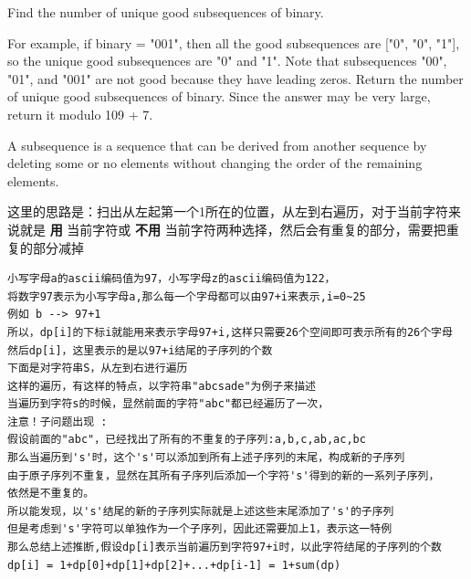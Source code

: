 \documentclass[9pt, b5paaper]{book}
\begin{document}
Find the number of unique good subsequences of binary.

For example, if binary = "001", then all the good subsequences are ["0", "0", "1"], so the unique good subsequences are "0" and "1". Note that subsequences "00", "01", and "001" are not good because they have leading zeros.
Return the number of unique good subsequences of binary. Since the answer may be very large, return it modulo 109 + 7.

A subsequence is a sequence that can be derived from another sequence by deleting some or no elements without changing the order of the remaining elements.

这里的思路是：扫出从左起第一个1所在的位置，从左到右遍历，对于当前字符来说就是 \textbf{用} 当前字符或 \textbf{不用} 当前字符两种选择，然后会有重复的部分，需要把重复的部分减掉
\begin{verbatim}
小写字母a的ascii编码值为97，小写字母z的ascii编码值为122，
将数字97表示为小写字母a,那么每一个字母都可以由97+i来表示,i=0~25
例如 b --> 97+1
所以，dp[i]的下标i就能用来表示字母97+i,这样只需要26个空间即可表示所有的26个字母
然后dp[i]，这里表示的是以97+i结尾的子序列的个数
下面是对字符串S，从左到右进行遍历
这样的遍历，有这样的特点，以字符串"abcsade"为例子来描述
当遍历到字符s的时候，显然前面的字符"abc"都已经遍历了一次，
注意！子问题出现 : 
假设前面的"abc"，已经找出了所有的不重复的子序列:a,b,c,ab,ac,bc
那么当遍历到's'时，这个's'可以添加到所有上述子序列的末尾，构成新的子序列
由于原子序列不重复，显然在其所有子序列后添加一个字符's'得到的新的一系列子序列，
依然是不重复的。
所以能发现，以's'结尾的新的子序列实际就是上述这些末尾添加了's'的子序列
但是考虑到's'字符可以单独作为一个子序列，因此还需要加上1，表示这一特例
那么总结上述推断,假设dp[i]表示当前遍历到字符97+i时，以此字符结尾的子序列的个数
dp[i] = 1+dp[0]+dp[1]+dp[2]+...+dp[i-1] = 1+sum(dp)
\end{verbatim}
\end{document}
